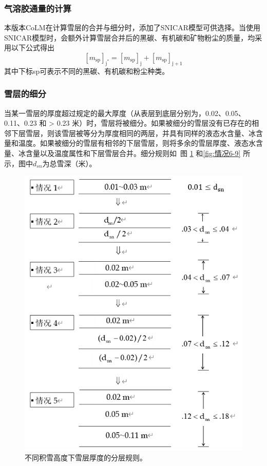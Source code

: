 \subsubsection{气溶胶通量的计算}

本版本CoLM在计算雪层的合并与细分时，添加了SNICAR模型可供选择。当使用SNICAR模型时，会额外计算雪层合并后的黑碳、有机碳和矿物粉尘的质量，均采用以下公式得出
\begin{equation}
\left[m_{\mathrm{sp}}\right]_{\mathrm{j}^{*}}=\left[m_{\mathrm{sp}}\right]_{\mathrm{j}}+\left[m_{\mathrm{sp}}\right]_{\mathrm{j}+1}
\end{equation}
其中下标sp可表示不同的黑碳、有机碳和粉尘种类。
\subsubsection{雪层的细分}
当某一雪层的厚度超过规定的最大厚度（从表层到底层分别为，0.02、0.05、0.11、0.23 和 > 0.23 米）时，雪层将被细分。如果被细分的雪层没有已存在的相邻下层雪层，则该雪层被等分为厚度相同的两层，并具有同样的液态水含量、冰含量和温度。如果被细分的雪层有相邻的下层雪层，则将多余的雪层厚度、液态水含量、冰含量以及温度属性和下层雪层合并。细分规则如~图 \ref{fig:情况1-5} 和\ref{fig:情况6-9} 所示，图中$d_{sn}$为总雪深（米）。

{
\begin{figure}[]
\centering
\includegraphics{Figures/雪盖土壤热力过程/情况1-5.png}
\caption{不同积雪高度下雪层厚度的分层规则。}
\label{fig:情况1-5}
\end{figure}
}

